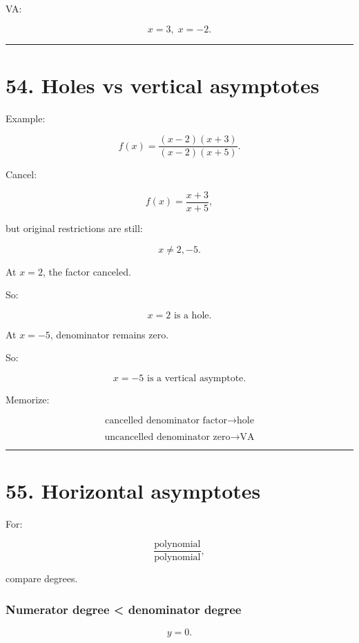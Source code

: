 \documentclass[
]{article}
\begin{document}
VA:

\[
\boxed{x=3,\;x=-2}.
\]

\begin{center}\rule{0.5\linewidth}{0.5pt}\end{center}

\section{54. Holes vs vertical
asymptotes}\label{holes-vs-vertical-asymptotes}

Example:

\[
f(x)=
\frac{(x-2)(x+3)}
{(x-2)(x+5)}.
\]

Cancel:

\[
f(x)=\frac{x+3}{x+5},
\]

but original restrictions are still:

\[
x\neq2,-5.
\]

At \(x=2\), the factor canceled.

So:

\[
\boxed{x=2\text{ is a hole}}.
\]

At \(x=-5\), denominator remains zero.

So:

\[
\boxed{x=-5\text{ is a vertical asymptote}}.
\]

Memorize:

\[
\boxed{\text{cancelled denominator factor} \rightarrow \text{hole}}
\]

\[
\boxed{\text{uncancelled denominator zero} \rightarrow \text{VA}}
\]

\begin{center}\rule{0.5\linewidth}{0.5pt}\end{center}

\section{55. Horizontal asymptotes}\label{horizontal-asymptotes}

For:

\[
\frac{\text{polynomial}}{\text{polynomial}},
\]

compare degrees.

\subsubsection{Numerator degree \textless{} denominator
degree}\label{numerator-degree-denominator-degree}

\[
\boxed{y=0}.
\]
\end{document}
